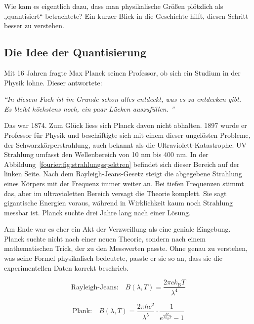 Wie kam es eigentlich dazu, dass man physikalische Größen plötzlich als „quantisiert“ betrachtete?  
Ein kurzer Blick in die Geschichte hilft, diesen Schritt besser zu verstehen.

\subsection{Die Idee der Quantisierung\label{fourier:subsection:DieIdeeDerQuantisierung}}
	Mit 16 Jahren fragte Max Planck seinen Professor, ob sich ein Studium in der Physik lohne. 
	Dieser antwortete:
	
	\begin{center}
		\textit{``{}In diesem Fach ist im Grunde schon alles entdeckt, was es zu entdecken gibt.\\
			Es bleibt höchstens noch, ein paar Lücken auszufüllen. ''}
	\end{center}
	
	Das war 1874.
	Zum Glück liess sich Planck davon nicht abhalten.
	1897 wurde er Professor für Physik und beschäftigte sich mit einem dieser ungelösten Probleme, der Schwarzkörperstrahlung, auch bekannt als die Ultraviolett-Katastrophe. 
	UV Strahlung umfasst den Wellenbereich von 10 nm bis 400 nm. 
	In der Abbildung~\ref{fourier:fig:strahlungsspektren} befindet sich dieser Bereich auf der linken Seite.
	Nach dem Rayleigh-Jeans-Gesetz steigt die abgegebene Strahlung eines Körpers mit der Frequenz immer weiter an. 
	Bei tiefen Frequenzen stimmt das, aber im ultravioletten Bereich versagt die Theorie komplett. 
	Sie sagt gigantische Energien voraus, während in Wirklichkeit kaum noch Strahlung messbar ist.
	Planck suchte drei Jahre lang nach einer Lösung. 
	
	
	Am Ende war es eher ein Akt der Verzweiflung als eine geniale Eingebung. 
	Planck suchte nicht nach einer neuen Theorie, sondern nach einem mathematischen Trick, der zu den Messwerten passte.
	Ohne genau zu verstehen, was seine Formel physikalisch bedeutete, passte er sie so an, dass sie die experimentellen Daten korrekt beschrieb.


	\begin{equation}
		\text{Rayleigh-Jeans:} \quad B(\lambda, T) = \frac{2 \pi c k_\mathrm{B} T}{\lambda^4}
	\end{equation}

	\begin{equation}
		\text{Plank:} \quad B(\lambda, T) = \frac{2 \pi h c^2}{\lambda^5} \cdot \frac{1}{e^{\frac{h c}{\lambda k_B T}} - 1}
	\end{equation}
	

